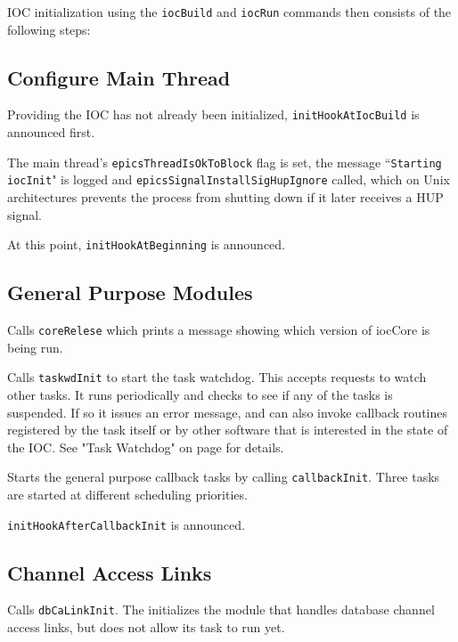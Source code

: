 IOC initialization using the \verb|iocBuild| and \verb|iocRun| commands then consists of the following steps:

\subsection{Configure Main Thread}

Providing the IOC has not already been initialized, \verb|initHookAtIocBuild| is announced first.

The main thread's \verb|epicsThreadIsOkToBlock| flag is set, the message ``\verb|Starting iocInit|" is logged and 
\verb|epicsSignalInstallSigHupIgnore| called, which on Unix architectures prevents the process from shutting down 
if it later receives a HUP signal.

At this point, \verb|initHookAtBeginning| is announced.

\subsection{General Purpose Modules}

Calls \verb|coreRelese| which prints a message showing which version of iocCore is being run.

Calls \verb|taskwdInit| to start the task watchdog.
This accepts requests to watch other tasks.
It runs periodically and checks to see if any of the tasks is suspended.
If so it issues an error message, and can also invoke callback routines registered by the task itself or by other software that is interested in the state of the IOC.
See "Task Watchdog" on page \pageref{Task Watchdog} for details.

Starts the general purpose callback tasks by calling \verb|callbackInit|.
Three tasks are started at different scheduling priorities.

\verb|initHookAfterCallbackInit| is announced.

\subsection{Channel Access Links}

Calls \verb|dbCaLinkInit|.
The initializes the module that handles database channel access links, but does not allow its task to run yet.

